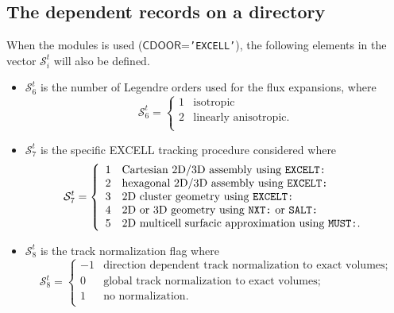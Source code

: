 \subsection{The  dependent records on a
 directory}\label{sect:excelltrackingdir}

When the  modules is used ($\mathsf{CDOOR}$={\tt 'EXCELL'}), the following elements in the vector
$\mathcal{S}^{t}_{i}$ will also be defined.

\begin{itemize}
\item $\mathcal{S}^{t}_{6}$ is the number of Legendre orders used for the flux expansions, where
\begin{displaymath}
\mathcal{S}^{t}_{6} = \left\{
\begin{array}{rl}
 1 & \textrm{isotropic} \\
 2 & \textrm{linearly anisotropic.} \\
\end{array} \right.
\end{displaymath}

\item $\mathcal{S}^{t}_{7}$ is the specific EXCELL tracking procedure considered where
\begin{displaymath}
\mathcal{S}^{t}_{7} = \left\{
\begin{array}{rl}
 1 & \textrm{Cartesian 2D/3D assembly using {\tt EXCELT:}} \\
 2 & \textrm{hexagonal 2D/3D assembly using {\tt EXCELT:}} \\
 3 & \textrm{2D cluster geometry using {\tt EXCELT:}} \\
 4 & \textrm{2D or 3D geometry using {\tt NXT:} or {\tt SALT:}} \\
 5 & \textrm{2D multicell surfacic approximation using {\tt MUST:}.} \\
\end{array} \right.
\end{displaymath}

\item $\mathcal{S}^{t}_{8}$ is the track normalization flag where
\begin{displaymath}
\mathcal{S}^{t}_{8} = \left\{
\begin{array}{rl}
 -1 & \textrm{direction dependent track normalization to exact volumes;} \\
 0 & \textrm{global track normalization to exact volumes;} \\
 1 & \textrm{no normalization.} \\
\end{array} \right.
\end{displaymath}


\end{itemize}
